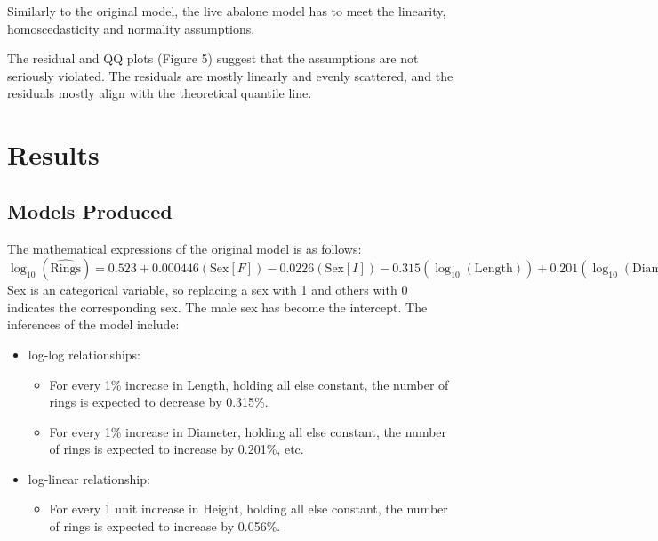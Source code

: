 \documentclass[a4paper,9pt,twocolumn,twoside,]{pinp}
\providecommand{\tightlist}{%
  \setlength{\itemsep}{0pt}\setlength{\parskip}{0pt}}
\begin{document}
Similarly to the original model, the live abalone model has to meet the
linearity, homoscedasticity and normality assumptions.

The residual and QQ plots (Figure 5) suggest that the assumptions are
not seriously violated. The residuals are mostly linearly and evenly
scattered, and the residuals mostly align with the theoretical quantile
line.

\hypertarget{results}{%
\section{Results}\label{results}}

\hypertarget{models-produced}{%
\subsection{Models Produced}\label{models-produced}}

The mathematical expressions of the original model is as follows:\\

\(\log_{10}(\widehat{\text{Rings}}) = 0.523 + 0.000446(\text{Sex}[F]) - 0.0226(\text{Sex}[I]) -0.315(\log_{10}(\text{Length})) + 0.201(\log_{10}(\text{Diameter})) + 0.000555(\text{Height}) + 0.59(\log_{10}(\text{Whole Weight})) -0.583(\log_{10}(\text{Shucked Weight})) -0.0759(\log_{10}(\text{Viscera Weight})) + 0.366(\log_{10}(\text{Shell Weight}))\)\\

Sex is an categorical variable, so replacing a sex with 1 and others
with 0 indicates the corresponding sex. The male sex has become the
intercept. The inferences of the model include:

\begin{itemize}
\tightlist
\item
  log-log relationships:

  \begin{itemize}
  \tightlist
  \item
    For every 1\% increase in Length, holding all else constant, the
    number of rings is expected to decrease by 0.315\%.
  \item
    For every 1\% increase in Diameter, holding all else constant, the
    number of rings is expected to increase by 0.201\%, etc.
  \end{itemize}
\item
  log-linear relationship:

  \begin{itemize}
  \tightlist
  \item
    For every 1 unit increase in Height, holding all else constant, the
    number of rings is expected to increase by 0.056\%.
  \end{itemize}
\end{itemize}
\end{document}

